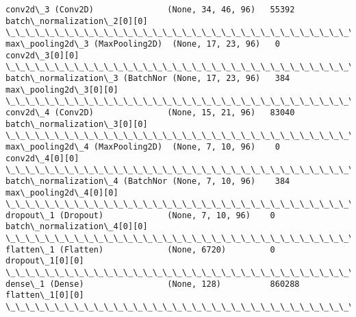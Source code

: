 \documentclass[11pt]{article}
\begin{document}
\begin{Verbatim}[commandchars=\\\{\}]
conv2d\_3 (Conv2D)               (None, 34, 46, 96)   55392       batch\_normalization\_2[0][0]      
\_\_\_\_\_\_\_\_\_\_\_\_\_\_\_\_\_\_\_\_\_\_\_\_\_\_\_\_\_\_\_\_\_\_\_\_\_\_\_\_\_\_\_\_\_\_\_\_\_\_\_\_\_\_\_\_\_\_\_\_\_\_\_\_\_\_\_\_\_\_\_\_\_\_\_\_\_\_\_\_\_\_\_\_\_\_\_\_\_\_\_\_\_\_\_\_\_\_
max\_pooling2d\_3 (MaxPooling2D)  (None, 17, 23, 96)   0           conv2d\_3[0][0]                   
\_\_\_\_\_\_\_\_\_\_\_\_\_\_\_\_\_\_\_\_\_\_\_\_\_\_\_\_\_\_\_\_\_\_\_\_\_\_\_\_\_\_\_\_\_\_\_\_\_\_\_\_\_\_\_\_\_\_\_\_\_\_\_\_\_\_\_\_\_\_\_\_\_\_\_\_\_\_\_\_\_\_\_\_\_\_\_\_\_\_\_\_\_\_\_\_\_\_
batch\_normalization\_3 (BatchNor (None, 17, 23, 96)   384         max\_pooling2d\_3[0][0]            
\_\_\_\_\_\_\_\_\_\_\_\_\_\_\_\_\_\_\_\_\_\_\_\_\_\_\_\_\_\_\_\_\_\_\_\_\_\_\_\_\_\_\_\_\_\_\_\_\_\_\_\_\_\_\_\_\_\_\_\_\_\_\_\_\_\_\_\_\_\_\_\_\_\_\_\_\_\_\_\_\_\_\_\_\_\_\_\_\_\_\_\_\_\_\_\_\_\_
conv2d\_4 (Conv2D)               (None, 15, 21, 96)   83040       batch\_normalization\_3[0][0]      
\_\_\_\_\_\_\_\_\_\_\_\_\_\_\_\_\_\_\_\_\_\_\_\_\_\_\_\_\_\_\_\_\_\_\_\_\_\_\_\_\_\_\_\_\_\_\_\_\_\_\_\_\_\_\_\_\_\_\_\_\_\_\_\_\_\_\_\_\_\_\_\_\_\_\_\_\_\_\_\_\_\_\_\_\_\_\_\_\_\_\_\_\_\_\_\_\_\_
max\_pooling2d\_4 (MaxPooling2D)  (None, 7, 10, 96)    0           conv2d\_4[0][0]                   
\_\_\_\_\_\_\_\_\_\_\_\_\_\_\_\_\_\_\_\_\_\_\_\_\_\_\_\_\_\_\_\_\_\_\_\_\_\_\_\_\_\_\_\_\_\_\_\_\_\_\_\_\_\_\_\_\_\_\_\_\_\_\_\_\_\_\_\_\_\_\_\_\_\_\_\_\_\_\_\_\_\_\_\_\_\_\_\_\_\_\_\_\_\_\_\_\_\_
batch\_normalization\_4 (BatchNor (None, 7, 10, 96)    384         max\_pooling2d\_4[0][0]            
\_\_\_\_\_\_\_\_\_\_\_\_\_\_\_\_\_\_\_\_\_\_\_\_\_\_\_\_\_\_\_\_\_\_\_\_\_\_\_\_\_\_\_\_\_\_\_\_\_\_\_\_\_\_\_\_\_\_\_\_\_\_\_\_\_\_\_\_\_\_\_\_\_\_\_\_\_\_\_\_\_\_\_\_\_\_\_\_\_\_\_\_\_\_\_\_\_\_
dropout\_1 (Dropout)             (None, 7, 10, 96)    0           batch\_normalization\_4[0][0]      
\_\_\_\_\_\_\_\_\_\_\_\_\_\_\_\_\_\_\_\_\_\_\_\_\_\_\_\_\_\_\_\_\_\_\_\_\_\_\_\_\_\_\_\_\_\_\_\_\_\_\_\_\_\_\_\_\_\_\_\_\_\_\_\_\_\_\_\_\_\_\_\_\_\_\_\_\_\_\_\_\_\_\_\_\_\_\_\_\_\_\_\_\_\_\_\_\_\_
flatten\_1 (Flatten)             (None, 6720)         0           dropout\_1[0][0]                  
\_\_\_\_\_\_\_\_\_\_\_\_\_\_\_\_\_\_\_\_\_\_\_\_\_\_\_\_\_\_\_\_\_\_\_\_\_\_\_\_\_\_\_\_\_\_\_\_\_\_\_\_\_\_\_\_\_\_\_\_\_\_\_\_\_\_\_\_\_\_\_\_\_\_\_\_\_\_\_\_\_\_\_\_\_\_\_\_\_\_\_\_\_\_\_\_\_\_
dense\_1 (Dense)                 (None, 128)          860288      flatten\_1[0][0]                  
\_\_\_\_\_\_\_\_\_\_\_\_\_\_\_\_\_\_\_\_\_\_\_\_\_\_\_\_\_\_\_\_\_\_\_\_\_\_\_\_\_\_\_\_\_\_\_\_\_\_\_\_\_\_\_\_\_\_\_\_\_\_\_\_\_\_\_\_\_\_\_\_\_\_\_\_\_\_\_\_\_\_\_\_\_\_\_\_\_\_\_\_\_\_\_\_\_\_

\end{Verbatim}
\end{document}
